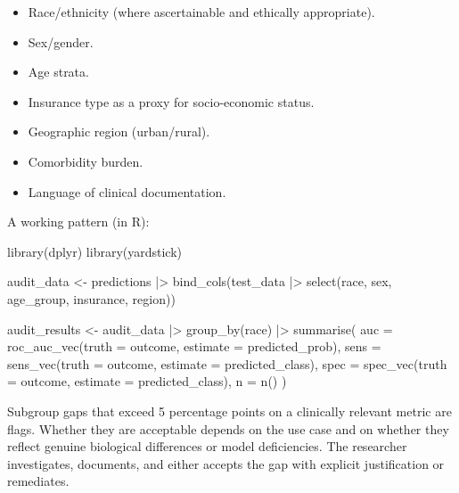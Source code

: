 \documentclass[
  letterpaper,
  11pt]{scrbook}
\newenvironment{Shaded}{\begin{snugshade}}{\end{snugshade}}
\newcommand{\AttributeTok}[1]{\textcolor[rgb]{0.40,0.45,0.13}{#1}}
\newcommand{\FunctionTok}[1]{\textcolor[rgb]{0.28,0.35,0.67}{#1}}
\newcommand{\NormalTok}[1]{\textcolor[rgb]{0.00,0.23,0.31}{#1}}
\newcommand{\OtherTok}[1]{\textcolor[rgb]{0.00,0.23,0.31}{#1}}
\newcommand{\SpecialCharTok}[1]{\textcolor[rgb]{0.37,0.37,0.37}{#1}}
\providecommand{\tightlist}{%
  \setlength{\itemsep}{0pt}\setlength{\parskip}{0pt}}
\begin{document}
\begin{itemize}
\tightlist
\item
  Race/ethnicity (where ascertainable and ethically appropriate).
\item
  Sex/gender.
\item
  Age strata.
\item
  Insurance type as a proxy for socio-economic status.
\item
  Geographic region (urban/rural).
\item
  Comorbidity burden.
\item
  Language of clinical documentation.
\end{itemize}

A working pattern (in R):

\begin{Shaded}
\begin{Highlighting}[]
\FunctionTok{library}\NormalTok{(dplyr)}
\FunctionTok{library}\NormalTok{(yardstick)}

\NormalTok{audit\_data }\OtherTok{\textless{}{-}}\NormalTok{ predictions }\SpecialCharTok{|\textgreater{}}
  \FunctionTok{bind\_cols}\NormalTok{(test\_data }\SpecialCharTok{|\textgreater{}} \FunctionTok{select}\NormalTok{(race, sex, age\_group,}
\NormalTok{                                  insurance, region))}

\NormalTok{audit\_results }\OtherTok{\textless{}{-}}\NormalTok{ audit\_data }\SpecialCharTok{|\textgreater{}}
  \FunctionTok{group\_by}\NormalTok{(race) }\SpecialCharTok{|\textgreater{}}
  \FunctionTok{summarise}\NormalTok{(}
    \AttributeTok{auc =} \FunctionTok{roc\_auc\_vec}\NormalTok{(}\AttributeTok{truth =}\NormalTok{ outcome,}
                     \AttributeTok{estimate =}\NormalTok{ predicted\_prob),}
    \AttributeTok{sens =} \FunctionTok{sens\_vec}\NormalTok{(}\AttributeTok{truth =}\NormalTok{ outcome,}
                    \AttributeTok{estimate =}\NormalTok{ predicted\_class),}
    \AttributeTok{spec =} \FunctionTok{spec\_vec}\NormalTok{(}\AttributeTok{truth =}\NormalTok{ outcome,}
                    \AttributeTok{estimate =}\NormalTok{ predicted\_class),}
    \AttributeTok{n =} \FunctionTok{n}\NormalTok{()}
\NormalTok{  )}
\end{Highlighting}
\end{Shaded}

Subgroup gaps that exceed 5 percentage points on a clinically relevant
metric are flags. Whether they are acceptable depends on the use case
and on whether they reflect genuine biological differences or model
deficiencies. The researcher investigates, documents, and either accepts
the gap with explicit justification or remediates.
\end{document}
